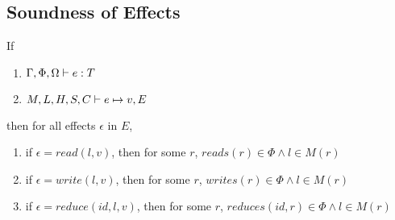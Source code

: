 \subsection{Soundness of Effects}

If
\begin{enumerate}
\item $\Gamma, \Phi, \Omega \vdash e : T$
\item $M, L, H, S, C \vdash e \mapsto v, E$
\end{enumerate}
then for all effects $\epsilon$ in $E$,
\begin{enumerate}
\item if $\epsilon = read(l, v)$, then for some $r$, $reads(r) \in \Phi \wedge l \in M(r)$
\item if $\epsilon = write(l, v)$, then for some $r$, $writes(r) \in \Phi \wedge l \in M(r)$
\item if $\epsilon = reduce(id, l, v)$, then for some $r$, $reduces(id,r) \in \Phi \wedge l \in M(r)$
\end{enumerate}




